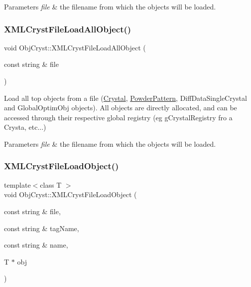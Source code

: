 \begin{DoxyParams}{Parameters}
{\em file} & the filename from which the objects will be loaded. \\
\hline
\end{DoxyParams}
\mbox{\label{namespace_obj_cryst_a9190567cd56ccba47cc6ce8e1336a6df}} 
\subsubsection{\texorpdfstring{XMLCrystFileLoadAllObject()}{XMLCrystFileLoadAllObject()}\hspace{0.1cm}{\footnotesize\ttfamily [2/2]}}
{\footnotesize\ttfamily void Obj\+Cryst\+::\+X\+M\+L\+Cryst\+File\+Load\+All\+Object (\begin{DoxyParamCaption}\item[{const string \&}]{file }\end{DoxyParamCaption})}



Load all \textquotesingle{}top\textquotesingle{} objects from a file (\mbox{\hyperlink{class_obj_cryst_1_1_crystal}{Crystal}}, \mbox{\hyperlink{class_obj_cryst_1_1_powder_pattern}{Powder\+Pattern}}, Diff\+Data\+Single\+Crystal and Global\+Optim\+Obj objects). All objects are directly allocated, and can be accessed through their respective global registry (eg g\+Crystal\+Registry fro a Crysta, etc...) 


\begin{DoxyParams}{Parameters}
{\em file} & the filename from which the objects will be loaded. \\
\hline
\end{DoxyParams}
\mbox{\label{namespace_obj_cryst_a1f8ac062564ea77ea9c56c7dccb9fdf8}} 
\subsubsection{\texorpdfstring{XMLCrystFileLoadObject()}{XMLCrystFileLoadObject()}}
{\footnotesize\ttfamily template$<$class T $>$ \\
void Obj\+Cryst\+::\+X\+M\+L\+Cryst\+File\+Load\+Object (\begin{DoxyParamCaption}\item[{const string \&}]{file,  }\item[{const string \&}]{tag\+Name,  }\item[{const string \&}]{name,  }\item[{T $\ast$}]{obj }\end{DoxyParamCaption})}



